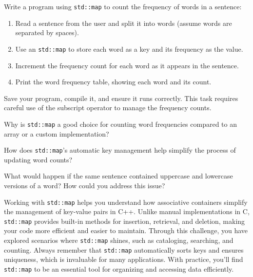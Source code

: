 \begin{challenge}
    \begin{task}
        Write a program using \texttt{std::map} to count the frequency of words in a sentence:
        \begin{enumerate}
            \item Read a sentence from the user and split it into words (assume words are separated by spaces).
            \item Use an \texttt{std::map} to store each word as a key and its frequency as the value.
            \item Increment the frequency count for each word as it appears in the sentence.
            \item Print the word frequency table, showing each word and its count.
        \end{enumerate}

        Save your program, compile it, and ensure it runs correctly. This task requires careful use of the subscript operator to manage the frequency counts.

        \begin{questions}
            \item Why is \texttt{std::map} a good choice for counting word frequencies compared to an array or a custom implementation?
            \item How does \texttt{std::map}'s automatic key management help simplify the process of updating word counts?
            \item What would happen if the same sentence contained uppercase and lowercase versions of a word? How could you address this issue?
        \end{questions}
    \end{task}

    \begin{advice}
        Working with \texttt{std::map} helps you understand how associative containers simplify the management of key-value pairs in C++. 
        Unlike manual implementations in C, \texttt{std::map} provides built-in methods for insertion, retrieval, and deletion, making your code more efficient and easier to maintain. 
        Through this challenge, you have explored scenarios where \texttt{std::map} shines, such as cataloging, searching, and counting. 
        Always remember that \texttt{std::map} automatically sorts keys and ensures uniqueness, which is invaluable for many applications. 
        With practice, you'll find \texttt{std::map} to be an essential tool for organizing and accessing data efficiently.
    \end{advice}
\end{challenge}
